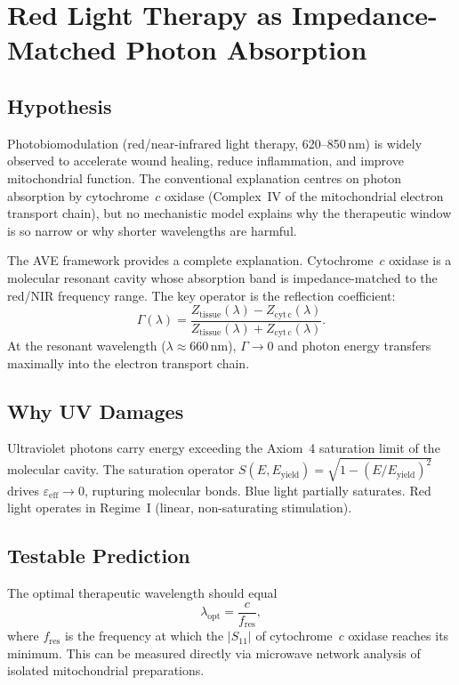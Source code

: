 \section{Red Light Therapy as Impedance-Matched Photon Absorption}
\label{sec:red_light_therapy}

\subsection{Hypothesis}

Photobiomodulation (red/near-infrared light therapy, 620--850\,nm)
is widely observed to accelerate wound healing, reduce inflammation,
and improve mitochondrial function.  The conventional explanation
centres on photon absorption by cytochrome~$c$ oxidase (Complex~IV
of the mitochondrial electron transport chain), but no mechanistic
model explains why the therapeutic window is so narrow or why
shorter wavelengths are harmful.

The AVE framework provides a complete explanation.  Cytochrome~$c$
oxidase is a molecular resonant cavity whose absorption band is
impedance-matched to the red/NIR frequency range.  The key operator
is the reflection coefficient:
\begin{equation}
  \Gamma(\lambda)
  = \frac{Z_{\mathrm{tissue}}(\lambda) - Z_{\mathrm{cyt\,c}}(\lambda)}
         {Z_{\mathrm{tissue}}(\lambda) + Z_{\mathrm{cyt\,c}}(\lambda)}.
\end{equation}
At the resonant wavelength ($\lambda \approx 660$\,nm), $\Gamma
\to 0$ and photon energy transfers maximally into the electron
transport chain.

\subsection{Why UV Damages}

Ultraviolet photons carry energy exceeding the Axiom~4 saturation
limit of the molecular cavity.  The saturation operator
$S(E, E_{\mathrm{yield}}) = \sqrt{1 - (E/E_{\mathrm{yield}})^2}$
drives $\varepsilon_{\mathrm{eff}} \to 0$, rupturing molecular
bonds.  Blue light partially saturates.  Red light operates in
Regime~I (linear, non-saturating stimulation).

\subsection{Testable Prediction}

The optimal therapeutic wavelength should equal
\begin{equation}
  \lambda_{\mathrm{opt}} 
  = \frac{c}{f_{\mathrm{res}}},
\end{equation}
where $f_{\mathrm{res}}$ is the frequency at which the
$|S_{11}|$ of cytochrome~$c$ oxidase reaches its minimum.  This
can be measured directly via microwave network analysis of isolated
mitochondrial preparations.
